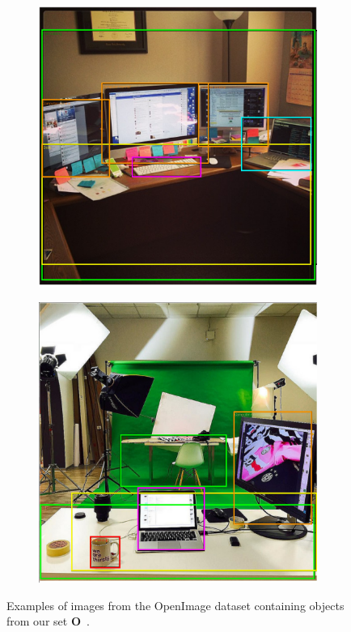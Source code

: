 \documentclass[a4paper, twoside]{article}
\begin{document}
\begin{figure}
  \centering
  \begin{subfigure}
    \centering
    \includegraphics[width=\columnwidth]{../figures/desk_example.png}
  \end{subfigure}
  \vfill
  \begin{subfigure}
    \centering
    \includegraphics[width=\columnwidth]{../figures/mug_example.png}
  \end{subfigure}
  \caption{Examples of images from the OpenImage dataset containing objects from our set $\mathbf{O}$~\cite{openimages}. }\label{fig:openimage-example}
\end{figure}
\end{document}
